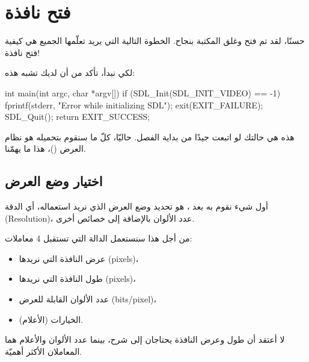 \section{فتح نافذة}

حسنًا، لقد تم فتح وغلق المكتبة بنجاح. الخطوة التالية التي يريد تعلّمها الجميع هي كيفية فتح نافذة! 

لكي نبدأ، تأكد من أن لديك
تشبه هذه:

\begin{Csource}
int main(int argc, char *argv[])
{
	if (SDL_Init(SDL_INIT_VIDEO) == -1)
	{
		fprintf(stderr, "Error while initializing SDL");
		exit(EXIT_FAILURE);
	}
	SDL_Quit();
	return EXIT_SUCCESS;
}
\end{Csource}

هذه هي حالتك لو اتبعت جيدًا من بداية الفصل. حاليّا، كلّ ما سنقوم بتحميله هو نظام العرض
()،
هذا ما يهمّنا.
\subsection{اختيار وضع العرض}

أول شيء نقوم به بعد 
،
هو تحديد وضع العرض الذي نريد استعماله، أي الدقة
(\textenglish{Resolution})،
عدد الألوان بالإضافة إلى خصائص أخرى.

من أجل هذا سنستعمل الدالة
التي تستقبل 4 معاملات:

\begin{itemize}
	\item عرض النافذة التي نريدها
	(\textenglish{pixels})،
	\item طول النافذة التي نريدها
	(\textenglish{pixels})،
	\item عدد الألوان القابلة للعرض
	(\textenglish{bits/pixel})،
	\item الخيارات (الأعلام).
\end{itemize}

لا أعتقد أن طول وعرض النافذة يحتاجان إلى شرح، بينما عدد الألوان والأعلام هما المعاملان الأكثر أهميّة.

